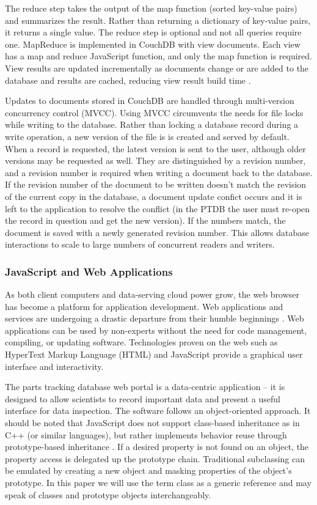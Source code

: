\documentclass[journal]{IEEEtran}
\begin{document}
The reduce step takes the output of the map function (sorted key-value pairs) and summarizes the result. Rather than returning a dictionary
of key-value pairs, it returns a single value. The reduce
step is optional and not all queries require one. MapReduce is implemented in CouchDB with view documents. Each view has
a map and reduce JavaScript function, and only the map function is required. View results are updated incrementally as
documents change or are added to the database and results are cached, reducing view result build time \cite{couchdb_guide}.

Updates to documents stored in CouchDB are handled through multi-version concurrency control (MVCC). Using MVCC
circumvents the needs for file locks while writing to the database. Rather than locking a database record during
a write operation, a new version of the file is is created and served by default. When a 
record is requested, the latest version is sent to the user, although older versions may be requested as well.
They are distinguished by a revision number, and a revision number is required when writing a document back 
to the database. If the revision number of the document to be written doesn't match the revision of the current
copy in the database,
a document update confict occurs and it is left to the application to resolve the conflict (in the PTDB the user must
re-open the record in question and get the new version). If the numbers match,
the document is saved with a newly generated revision number.
This allows database interactions to scale to large numbers of concurrent readers and writers.

\subsubsection{JavaScript and Web Applications}
As both client computers and data-serving cloud power grow, the web browser has become a
platform for application development. Web applications and services are undergoing
a drastic departure from their humble beginnings \cite{ginige_web}. Web applications can be used by 
non-experts without the need for code management, compiling, or updating software. Technologies proven on the web such as HyperText Markup Language (HTML)
and JavaScript provide a graphical user interface and interactivity. 

The parts tracking database web portal is a data-centric application -- it is designed
to allow scientists to record important data and present a useful interface for data inspection. The software follows an 
object-oriented approach. It should be noted that JavaScript does not support class-based inheritance as
in C++ (or similar languages), but rather implements behavior reuse through prototype-based inheritance \cite{gama_js_objects}. If a desired
property is not found on an object, the property access is delegated up the prototype chain. Traditional subclassing
can be emulated by creating a new object and masking properties of the object's prototype.
In this paper we will use the term class as a generic reference and may speak of
classes and prototype objects interchangeably.
\end{document}
